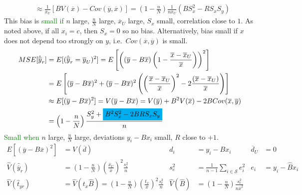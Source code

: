 \documentclass[landscape]{article}
\begin{document}
\begin{multicols*}{3}
\begin{align*}
  \\ & \approx \frac{1}{\overline{x}_U} [BV(\overline{x}) - Cov(\overline{y}, \overline{x})]
       = \left(1 - \frac{n}{N}\right) \frac{1}{n\overline{x}_U} (B S_x^2 - R S_xS_y)
\end{align*}
This bias
is \textcolor{green}{small if} $n$ large, $\frac{n}{N}$ large,
$\overline{x}_U$ large, $S_x$ small, correlation close to $1$. As
noted above, if all $x_i = c$, then $S_x = 0$ so no
bias. Alternatively, bias small if $x$ does not depend too strongly on
$y$, i.e.\ $Cov(\overline{x},\overline{y})$ is small.
\begin{align*}
  MSE[\hat{\overline{y}}_r] & = E[(\hat{\overline{y}}_r = \overline{y}_U)^2]
                              = E \left[ \left((\overline{y}-B \overline{x}) \left(1 - \frac{\overline{x}-\overline{x}_U}{\overline{x}}\right)\right)^2\right]
  \\ & = E \left[(\overline{y} - B \overline{x})^2 + (\overline{y}-B \overline{x})^2 \left( \left(\frac{\overline{x}-\overline{x}_U}{\overline{x}}\right)^2 - 2 \frac{(\overline{x}-\overline{x}_U)}{\overline{x}}\right)\right]
  \\ & \approx E[(\overline{y}-B\overline{x})^2] = V(\overline{y} - B \overline{x})
   = V(\overline{y}) + B^2 V(\overline{x}) - 2B Cov(\overline{x}, \overline{y})
  \\ & = \left(1 - \frac{n}{N}\right) \frac{S_y^2 + \colorbox{cyan}{$B^2S_x^2-2BRS_xS_y$}}{n}
\end{align*}
\textcolor{green}{Small when} $n$ large, $\frac{n}{N}$ large,
deviations $y_i - B
x_i$ small, $R$ close to $+1$.
\begin{align*}
  E[(\overline{y}-B \overline{x})^2] & = V(\overline{d})
  & d_i & = y_i - Bx_i & \overline{d}_U &= 0
  \\ \hat{V}(\hat{\overline{y}}_r) & = \left(1 - \frac{n}{N}\right) \left(\frac{\overline{x}_U}{\overline{x}}\right)^2 \frac{s_e^2}{n}
  & s_e^2 & =
            \frac{1}{n - 1} \sum_{i \in \mathcal{S}}e_i^2
  & e_i & = y_i - \hat{B}x_i
  \\ \hat{V}(\hat{t}_{yr}) & = \hat{V}(t_x \hat{B}) = \left(1 - \frac{n}{N}\right) \left(\frac{t_x}{\overline{x}}\right)^2 \frac{s_e^2}{n}
  & \hat{V}(\hat{B}) & = \left(1 - \frac{n}{N}\right) \frac{s^2_e}{n \overline{x}^2}
\end{align*}

\end{multicols*}
\end{document}
